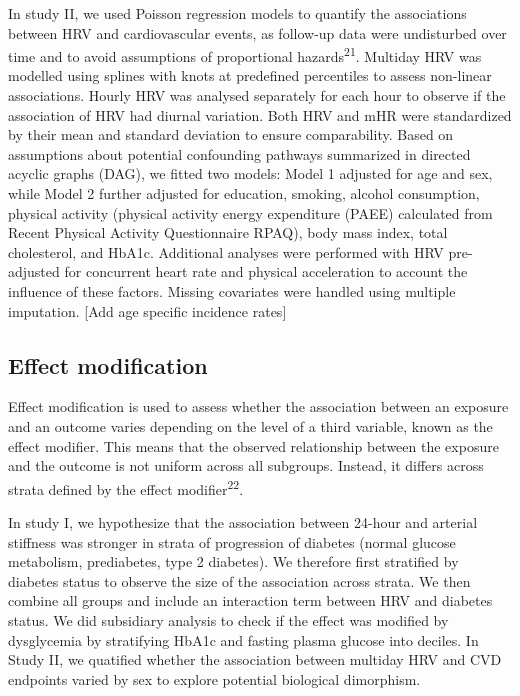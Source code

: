 \documentclass[
  a4paper,
  headsepline=true,
  open=any]{scrbook}
\begin{document}
In study II, we used Poisson regression models to quantify the
associations between HRV and cardiovascular events, as follow-up data
were undisturbed over time and to avoid assumptions of proportional
hazards\textsuperscript{21}. Multiday HRV was modelled using splines
with knots at predefined percentiles to assess non-linear associations.
Hourly HRV was analysed separately for each hour to observe if the
association of HRV had diurnal variation. Both HRV and mHR were
standardized by their mean and standard deviation to ensure
comparability. Based on assumptions about potential confounding pathways
summarized in directed acyclic graphs (DAG), we fitted two models: Model
1 adjusted for age and sex, while Model 2 further adjusted for
education, smoking, alcohol consumption, physical activity (physical
activity energy expenditure (PAEE) calculated from Recent Physical
Activity Questionnaire RPAQ), body mass index, total cholesterol, and
HbA1c. Additional analyses were performed with HRV pre-adjusted for
concurrent heart rate and physical acceleration to account the influence
of these factors. Missing covariates were handled using multiple
imputation. {[}Add age specific incidence rates{]}

\hypertarget{effect-modification}{%
\subsection{Effect modification}\label{effect-modification}}

Effect modification is used to assess whether the association between an
exposure and an outcome varies depending on the level of a third
variable, known as the effect modifier. This means that the observed
relationship between the exposure and the outcome is not uniform across
all subgroups. Instead, it differs across strata defined by the effect
modifier\textsuperscript{22}.

In study I, we hypothesize that the association between 24-hour and
arterial stiffness was stronger in strata of progression of diabetes
(normal glucose metabolism, prediabetes, type 2 diabetes). We therefore
first stratified by diabetes status to observe the size of the
association across strata. We then combine all groups and include an
interaction term between HRV and diabetes status. We did subsidiary
analysis to check if the effect was modified by dysglycemia by
stratifying HbA1c and fasting plasma glucose into deciles. In Study II,
we quatified whether the association between multiday HRV and CVD
endpoints varied by sex to explore potential biological dimorphism.
\end{document}
